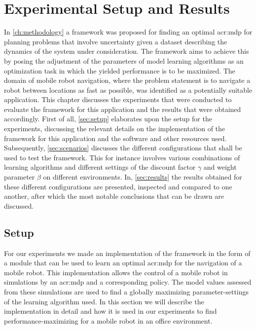 \chapter{Experimental Setup and Results}
\label{ch:experimental-results}


In \autoref{ch:methodology} a framework was proposed for finding an optimal \acrshort{acr:mdp} for planning problems that involve uncertainty given a dataset describing the dynamics of the system under consideration.
The framework aims to achieve this by posing the adjustment of the parameters of model learning algorithms as an optimization task in which the yielded performance is to be maximized.
The domain of mobile robot navigation, where the problem statement is to navigate a robot between locations as fast as possible, was identified as a potentially suitable application.
This chapter discusses the experiments that were conducted to evaluate the framework for this application and the results that were obtained accordingly.
First of all, \autoref{sec:setup} elaborates upon the setup for the experiments, discussing the relevant details on the implementation of the framework for this application and the software and other resources used.
Subsequently, \autoref{sec:scenarios} discusses the different configurations that shall be used to test the framework.
This for instance involves various combinations of learning algorithms and different settings of the discount factor $\gamma$ and weight parameter $\beta$ on different environments.
In, \autoref{sec:results} the results obtained for these different configurations are presented, inspected and compared to one another, after which the most notable conclusions that can be drawn are discussed.

\section{Setup}
\label{sec:setup}

For our experiments we made an implementation of the framework in the form of a module that can be used to learn an optimal \acrshort{acr:mdp} for the navigation of a mobile robot.
This implementation allows the control of a mobile robot in simulations by an \acrshort{acr:mdp} and a corresponding policy.
The model values assessed from these simulations are used to find a globally maximizing parameter-settings of the learning algorithm used.
In this section we will describe the implementation in detail and how it is used in our experiments to find performance-maximizing  for a mobile robot in an office environment.

